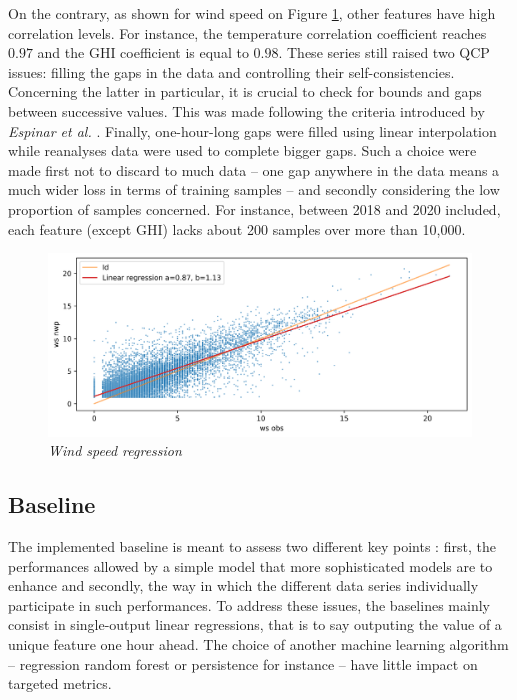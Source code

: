 \documentclass{article}
\newcommand{\saut}{\vspace{10px}}
\begin{document}
On the contrary, as shown for wind speed on Figure \ref{ws_straight}, other features have high correlation levels.
For instance, the temperature correlation coefficient reaches $0.97$ and the GHI coefficient is equal to $0.98$.
These series still raised two QCP issues: filling the gaps in the data and controlling their self-consistencies.
Concerning the latter in particular, it is crucial to check for bounds and gaps between successive values.
This was made following the criteria introduced by \emph{Espinar et al.} \cite{espinar_quality_nodate}.
Finally, one-hour-long gaps were filled using linear interpolation while reanalyses data were used
to complete bigger gaps. Such a choice were made first not to discard to much data -- one gap anywhere in
the data means a much wider loss in terms of training samples -- and secondly considering the low proportion
of samples concerned. For instance, between 2018 and 2020 included, each feature (except GHI) lacks about
200 samples over more than 10,000.

\saut

\begin{figure}[H]
    \centering
    \includegraphics[width=\linewidth]{img/ws_compare.png}
    \caption{\textit{Wind speed regression}}
   \label{ws_straight}
\end{figure}

\subsection*{Baseline}

The implemented baseline is meant to assess two different key points : first, the performances allowed by a simple
model that more sophisticated models are to enhance and secondly, the way in which the different data
series individually participate in such performances. To address these issues, the baselines mainly consist in single-output
linear regressions, that is to say outputing the value of a unique feature one hour ahead.
The choice of another machine learning algorithm -- regression random forest or persistence for instance -- have little
impact on targeted metrics.
\end{document}
